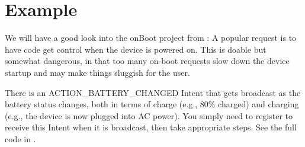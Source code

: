 \section{Example}
\begin{example}
We will have a good look into the onBoot project from \cite{murphymarkl.2017}: A popular request is to have code get control when the device is powered on. This is
doable but somewhat dangerous, in that too many on-boot requests slow down the
device startup and may make things sluggish for the user.
\end{example}

\begin{example}
	There is an ACTION\_BATTERY\_CHANGED Intent that gets broadcast as the battery
	status changes, both in terms of charge (e.g., 80\% charged) and charging (e.g., the
	device is now plugged into AC power). You simply need to register to receive this
	Intent when it is broadcast, then take appropriate steps. See the full code in \cite{murphymarkl.2017}.
\end{example}


